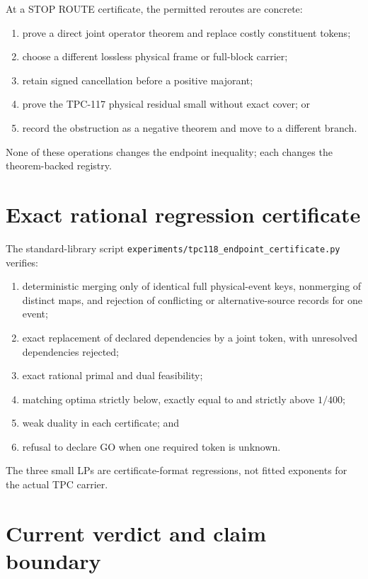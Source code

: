 \documentclass[11pt]{article}
\theoremstyle{definition}
\theoremstyle{remark}
\begin{document}
At a STOP ROUTE certificate, the permitted reroutes are concrete:
\begin{enumerate}[leftmargin=2em]
\item prove a direct joint operator theorem and replace costly
  constituent tokens;
\item choose a different lossless physical frame or full-block
  carrier;
\item retain signed cancellation before a positive majorant;
\item prove the TPC-117 physical residual small without exact cover;
  or
\item record the obstruction as a negative theorem and move to a
  different branch.
\end{enumerate}
None of these operations changes the endpoint inequality; each
changes the theorem-backed registry.

\section{Exact rational regression certificate}

The standard-library script
\texttt{experiments/tpc118\_endpoint\_certificate.py} verifies:
\begin{enumerate}[leftmargin=2em]
\item deterministic merging only of identical full physical-event
  keys, nonmerging of distinct maps, and rejection of conflicting or
  alternative-source records for one event;
\item exact replacement of declared dependencies by a joint token,
  with unresolved dependencies rejected;
\item exact rational primal and dual feasibility;
\item matching optima strictly below, exactly equal to and strictly
  above \(1/400\);
\item weak duality in each certificate; and
\item refusal to declare GO when one required token is unknown.
\end{enumerate}
The three small LPs are certificate-format regressions, not fitted
exponents for the actual TPC carrier.

\section{Current verdict and claim boundary}
\end{document}
